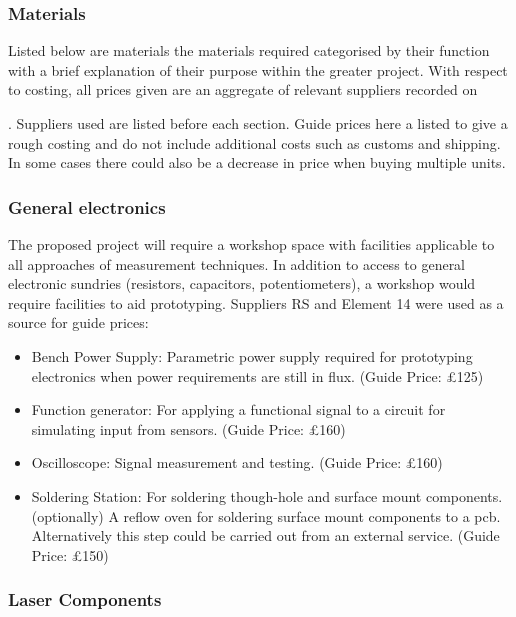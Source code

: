 \hypertarget{materials}{%
\subsubsection{Materials}\label{materials}}

Listed below are materials the materials required categorised by their function
with a brief explanation of their purpose within the greater project. With
respect to costing, all prices given are an aggregate of relevant
suppliers recorded on \date{\today}. Suppliers used are listed before each
section. Guide prices here a listed to give a rough costing and do not include
additional costs such as customs and shipping. In some cases there could also be
a decrease in price when buying multiple units.

\hypertarget{general-electronics}{%
\subsubsection{General electronics}\label{general-electronics}}

The proposed project will require a workshop space with facilities applicable to
all approaches of measurement techniques. In addition to access to general
electronic sundries (resistors, capacitors, potentiometers), a workshop would
require facilities to aid prototyping. Suppliers RS and Element 14 were used as
a source for guide prices:

\begin{itemize}
\tightlist
\item
  Bench Power Supply: Parametric power supply required for prototyping
  electronics when power requirements are still in flux. (Guide Price: £125)
\item
  Function generator: For applying a functional signal to a circuit for
  simulating input from sensors. (Guide Price: £160)
\item
  Oscilloscope: Signal measurement and testing. (Guide Price: £160)
\item
  Soldering Station: For soldering though-hole and surface mount components.
  (optionally) A reflow oven for soldering surface mount components to a pcb.
  Alternatively this step could be carried out from an external service. (Guide
  Price: £150)
\end{itemize}

\hypertarget{laser-components}{%
\subsubsection{Laser Components}\label{laser-components}}

